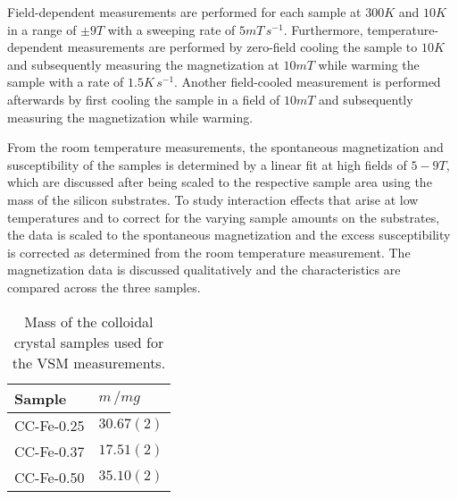 \documentclass[\main/dresen_thesis.tex]{subfiles}
\begin{document}
    Field-dependent measurements are performed for each sample at $300 \unit{K}$ and $10 \unit{K}$ in a range of $\pm 9 \unit{T}$ with a sweeping rate of $5 \unit{mT \, s^{-1}}$.
    Furthermore, temperature-dependent measurements are performed by zero-field cooling the sample to $10 \unit{K}$ and subsequently measuring the magnetization at $10 \unit{mT}$ while warming the sample with a rate of $1.5 \unit{K \, s^{-1}}$.
    Another field-cooled measurement is performed afterwards by first cooling the sample in a field of $10 \unit{mT}$ and subsequently measuring the magnetization while warming.

    From the room temperature measurements, the spontaneous magnetization and susceptibility of the samples is determined by a linear fit at high fields of $5 - 9 \unit{T}$, which are discussed after being scaled to the respective sample area using the mass of the silicon substrates.
    To study interaction effects that arise at low temperatures and to correct for the varying sample amounts on the substrates, the data is scaled to the spontaneous magnetization and the excess susceptibility is corrected as determined from the room temperature measurement.
    The magnetization data is discussed qualitatively and the characteristics are compared across the three samples.

    \begin{table}[htbp]
      \centering
      \caption{\label{tab:colloidalCrystals:layerCharacterization:ppmsMasses}Mass of the colloidal crystal samples used for the VSM measurements.}
      \begin{tabular}{ l | l}
        \rule{0pt}{2ex} \textbf{Sample}  & $m \, / \unit{mg}$ \\
        \hline
        \rule{0pt}{2ex} CC-Fe-0.25   & $30.67(2)$ \\
        \rule{0pt}{2ex} CC-Fe-0.37   & $17.51(2)$ \\
        \rule{0pt}{2ex} CC-Fe-0.50   & $35.10(2)$ \\
        \hline
      \end{tabular}
    \end{table}
\end{document}
